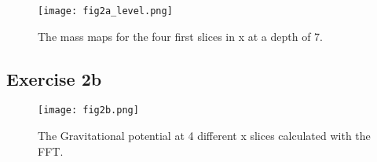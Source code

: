\begin{figure}[h!]
  \centering
  \texttt{[image: fig2a\_level.png]}
  \caption{The mass maps for the four first slices in x at a depth of 7.}
  \label{fig:2a3}
\end{figure}

\subsection{Exercise 2b}


\begin{figure}[h!]
  \centering
  \texttt{[image: fig2b.png]}
  \caption{The Gravitational potential at 4 different x slices calculated with the FFT.}
  \label{fig:2b}
\end{figure}
